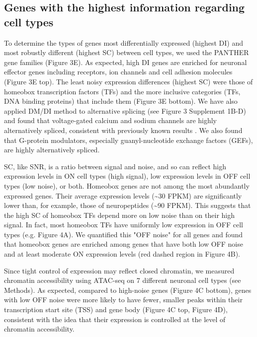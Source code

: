 \subsection{Genes with the highest information regarding cell types}

To determine the types of genes most differentially expressed (highest DI) and most robustly different (highest SC) between cell types, we used the PANTHER \citep{Thomas_2003} gene families (Figure 3E). As expected, high DI genes are enriched for neuronal effector genes including receptors, ion channels and cell adhesion molecules (Figure 3E top). The least noisy expression differences (highest SC) were those of homeobox transcription factors (TFs) and the more inclusive categories (TFs, DNA binding proteins) that include them (Figure 3E bottom). We have also applied DM/DI method to alternative splicing (see Figure 3 Supplement 1B-D) and found that voltage-gated calcium and sodium channels are highly alternatively spliced, consistent with previously known results \citep[e.g.][]{Lipscombe_2013}. We also found that G-protein modulators, especially guanyl-nucleotide exchange factors (GEFs), are highly alternatively spliced. 

SC, like SNR, is a ratio between signal and noise, and so can reflect high expression levels in ON cell types (high signal), low expression levels in OFF cell types (low noise), or both. Homeobox genes are not among the most abundantly expressed genes. Their average expression levels (\sim30 FPKM) are significantly lower than, for example, those of neuropeptides (\sim90 FPKM). This suggests that the high SC of homeobox TFs depend more on low noise than on their high signal. In fact, most homeobox TFs have uniformly low expression in OFF cell types (e.g. Figure 4A). We quantified this "OFF noise" for all genes and found that homeobox genes are enriched among genes that have both low OFF noise and at least moderate ON expression levels (red dashed region in Figure 4B).

Since tight control of expression may reflect closed chromatin, we measured chromatin accessibility using ATAC-seq \citep{Buenrostro_2013} on 7 different neuronal cell types (see Methods). As expected, compared to high-noise genes (Figure 4C bottom), genes with low OFF noise were more likely to have fewer, smaller peaks within their transcription start site (TSS) and gene body (Figure 4C top, Figure 4D), consistent with the idea that their expression is controlled at the level of chromatin accessibility.

